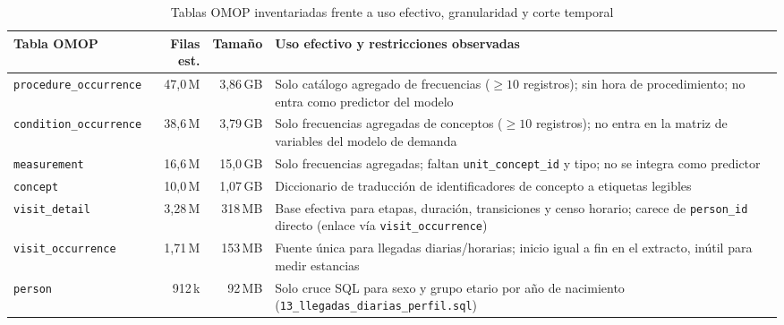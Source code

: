 \begin{table}[htbp]
\caption{Tablas OMOP inventariadas frente a uso efectivo, granularidad y corte temporal}
\label{tab:omop_uso}
{\singlespacing\small
\begin{tabularx}{\textwidth}{@{}L{0.24\textwidth} r r Y@{}}
\toprule
Tabla OMOP & Filas est. & Tamaño & Uso efectivo y restricciones observadas \\
\midrule
\texttt{procedure\_occurrence} & 47,0\,M & 3,86\,GB & Solo catálogo agregado de frecuencias ($\ge 10$ registros); sin hora de procedimiento; no entra como predictor del modelo \\
\texttt{condition\_occurrence} & 38,6\,M & 3,79\,GB & Solo frecuencias agregadas de conceptos ($\ge 10$ registros); no entra en la matriz de variables del modelo de demanda \\
\texttt{measurement} & 16,6\,M & 15,0\,GB & Solo frecuencias agregadas; faltan \texttt{unit\_concept\_id} y tipo; no se integra como predictor \\
\texttt{concept} & 10,0\,M & 1,07\,GB & Diccionario de traducción de identificadores de concepto a etiquetas legibles \\
\texttt{visit\_detail} & 3,28\,M & 318\,MB & Base efectiva para etapas, duración, transiciones y censo horario; carece de \texttt{person\_id} directo (enlace vía \texttt{visit\_occurrence}) \\
\texttt{visit\_occurrence} & 1,71\,M & 153\,MB & Fuente única para llegadas diarias/horarias; inicio igual a fin en el extracto, inútil para medir estancias \\
\texttt{person} & 912\,k & 92\,MB & Solo cruce SQL para sexo y grupo etario por año de nacimiento (\texttt{13\_llegadas\_diarias\_perfil.sql}) \\
\bottomrule
\end{tabularx}}
\end{table}


